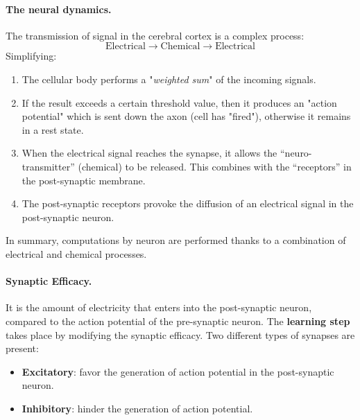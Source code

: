\paragraph*{The neural dynamics.} The transmission of signal in the cerebral cortex is a complex process:
$$\text{Electrical} \rightarrow \text{Chemical} \rightarrow \text{Electrical}$$
Simplifying:
\begin{enumerate}
	\item The cellular body performs a "\textit{weighted sum}" of the incoming signals.
	\item If the result exceeds a certain threshold value, then it produces an "action potential" which is sent down the axon (cell has "fired"), otherwise it remains in a rest state.
	\item When the electrical signal reaches the synapse, it allows the ``neuro-transmitter'' (chemical) to be released. This combines with the ``receptors'' in the post-synaptic membrane.
	\item The post-synaptic receptors provoke the diffusion of an electrical signal in the post-synaptic neuron. 
\end{enumerate}
In summary, computations by neuron are performed thanks to a combination of electrical and chemical processes. 

\paragraph*{Synaptic Efficacy.} It is the amount of electricity that enters into the post-synaptic neuron, compared to the action potential of the pre-synaptic neuron. The \textbf{learning step} takes place by modifying the synaptic efficacy. Two different types of synapses are present:
\begin{itemize}
	\item \textbf{Excitatory}: favor the generation of action potential in the post-synaptic neuron.
	\item \textbf{Inhibitory}: hinder the generation of action potential.
\end{itemize}

